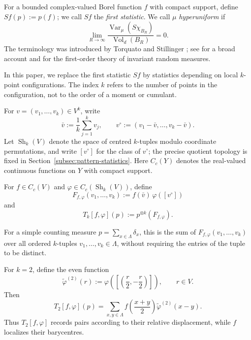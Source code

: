 \documentclass[11pt,reqno,a4paper]{amsart}
\numberwithin{equation}{section}
\theoremstyle{compact}
\theoremstyle{definition}
\theoremstyle{definition}
\newcommand{\Var}{\operatorname{Var}}
\newcommand{\Vol}{\operatorname{Vol}}
\newcommand{\Sh}{\operatorname{Sh}}
\begin{document}
For a bounded complex-valued Borel function $f$ with compact support, define
$Sf(p):=p(f)$; we call $Sf$ the \emph{first statistic}.  We call $\mu$ \emph{hyperuniform} if
\begin{equation}\label{eq:intro-hu1}
  \lim_{R\to\infty}
  \frac{\Var_\mu(S\chi_{B_R})}{\Vol_d(B_R)}=0.
\end{equation}
The terminology was introduced by Torquato and Stillinger
\cite{TS03}; see \cite{Tor18} for a broad account and \cite{BB26} for the
first-order theory of invariant random measures.

In this paper, we replace the first statistic $Sf$ by statistics depending on
local $k$-point configurations.  The index $k$ refers to the number of points
in the configuration, not to the order of a moment or cumulant.

For $v=(v_1,\ldots,v_k)\in V^k$, write
\[
  \bar v:=\frac1k\sum_{j=1}^k v_j,
  \qquad
  v^\circ:=(v_1-\bar v,\ldots,v_k-\bar v).
\]
Let $\Sh_k(V)$ denote the space of centred $k$-tuples modulo coordinate
permutations, and write $[v^\circ]$ for the class of $v^\circ$; the precise
quotient topology is fixed in Section~\ref{subsec:pattern-statistics}.  Here
$C_c(Y)$ denotes the real-valued continuous functions on $Y$ with compact
support.

\begin{samepage}
For $f\in C_c(V)$ and $\varphi\in C_c(\Sh_k(V))$, define
\begin{equation}\label{eq:intro-pattern-kernel}
  F_{f,\varphi}(v_1,\ldots,v_k)
  :=f(\bar v)\,\varphi([v^\circ])
\end{equation}
and
\begin{equation}\label{eq:intro-pattern-statistic}
  T_k[f,\varphi](p):=p^{\otimes k}(F_{f,\varphi}).
\end{equation}
\end{samepage}
For a simple counting measure $p=\sum_{x\in\Lambda}\delta_x$, this is the
sum of $F_{f,\varphi}(v_1,\ldots,v_k)$ over all ordered $k$-tuples
$v_1,\ldots,v_k\in\Lambda$, without requiring the entries of the tuple to
be distinct.

For $k=2$, define the even function
\[
  \widetilde\varphi^{(2)}(r)
  :=\varphi\!\left(\left[\left(\frac r2,-\frac r2\right)\right]\right),
  \qquad r\in V.
\]
Then
\[
  T_2[f,\varphi](p)
  =\sum_{x,y\in\Lambda}
  f\!\left(\frac{x+y}{2}\right)\widetilde\varphi^{(2)}(x-y).
\]
Thus $T_2[f,\varphi]$ records pairs according to their relative displacement,
while $f$ localizes their barycentres.
\end{document}
